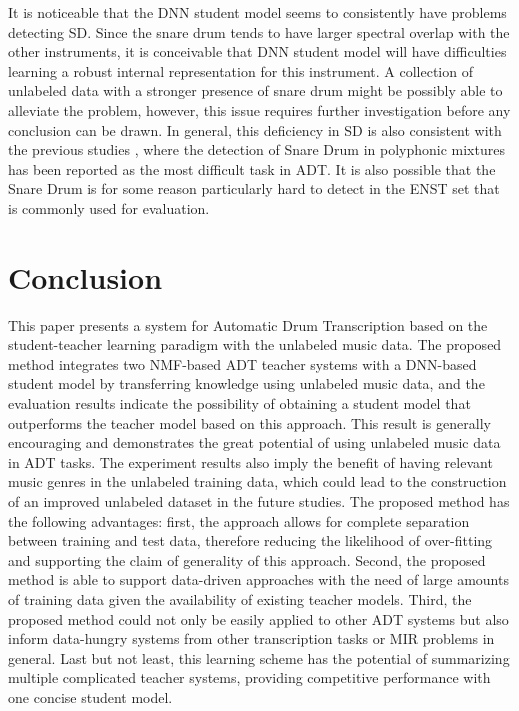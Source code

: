 \documentclass{article}
\begin{document}
It is noticeable that the DNN student model seems to consistently have problems detecting SD. Since the snare drum tends to have larger spectral overlap with the other instruments, it is conceivable that DNN student model will have difficulties learning a robust internal representation for this instrument. A collection of unlabeled data with a stronger presence of snare drum might be possibly able to alleviate the problem, however, this issue requires further investigation before any conclusion can be drawn. In general, this deficiency in SD is also consistent with the previous studies \cite{Paulus2009a, Wu2015a, Southall2016, Vogl2016}, where the detection of Snare Drum in polyphonic mixtures has been reported as the most difficult task in ADT. It is also possible that the Snare Drum is for some reason particularly hard to detect in the ENST set that is commonly used for evaluation. %
%

\section{Conclusion}\label{sec:conclusion}
This paper presents a system for Automatic Drum Transcription based on the student-teacher learning paradigm with the unlabeled music data. The proposed method integrates two NMF-based ADT teacher systems with a DNN-based student model by transferring knowledge using unlabeled music data, and the evaluation results indicate the possibility of obtaining a student model that outperforms the teacher model based on this approach. This result is generally encouraging and demonstrates the great potential of using unlabeled music data in ADT tasks. The experiment results also imply the benefit of having relevant music genres in the unlabeled training data, which could lead to the construction of an improved unlabeled dataset in the future studies. The proposed method has the following advantages: first, the approach allows for complete separation between training and test data, therefore reducing the likelihood of over-fitting and supporting the claim of generality of this approach. Second, the proposed method is able to support data-driven approaches with the need of large amounts of training data given the availability of existing teacher models. Third, the proposed method could not only be easily applied to other ADT systems but also inform data-hungry systems from other transcription tasks or MIR problems in general. Last but not least, this learning scheme has the potential of summarizing multiple complicated teacher systems, providing competitive performance with one concise student model. 
\end{document}
